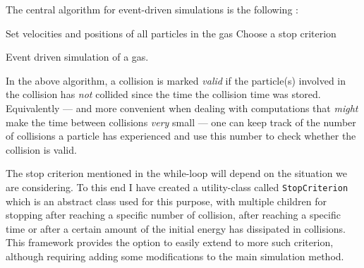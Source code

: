 The central algorithm for event-driven simulations is the following \cite{event_sim} \cite{sheet}:

\begin{algorithm}[H]
	Set velocities and positions of all particles in the gas\;
	Choose a stop criterion\;
	\caption{Event driven simulation of a gas.}
\end{algorithm}

In the above algorithm, a collision is marked \textit{valid} if the particle(s) involved in the collision has \textit{not} collided since the time the collision time was stored. Equivalently --- and more convenient when dealing with computations that \textit{might} make the time between collisions \textit{very} small --- one can keep track of the number of collisions a particle has experienced and use this number to check whether the collision is valid. 

The stop criterion mentioned in the while-loop will depend on the situation we are considering. To this end I have created a utility-class called \texttt{StopCriterion} which is an abstract class used for this purpose, with multiple children for stopping after reaching a specific number of collision, after reaching a specific time or after a certain amount of the initial energy has dissipated in collisions. This framework provides the option to easily extend to more such criterion, although requiring adding some modifications to the main simulation method.

\newpage